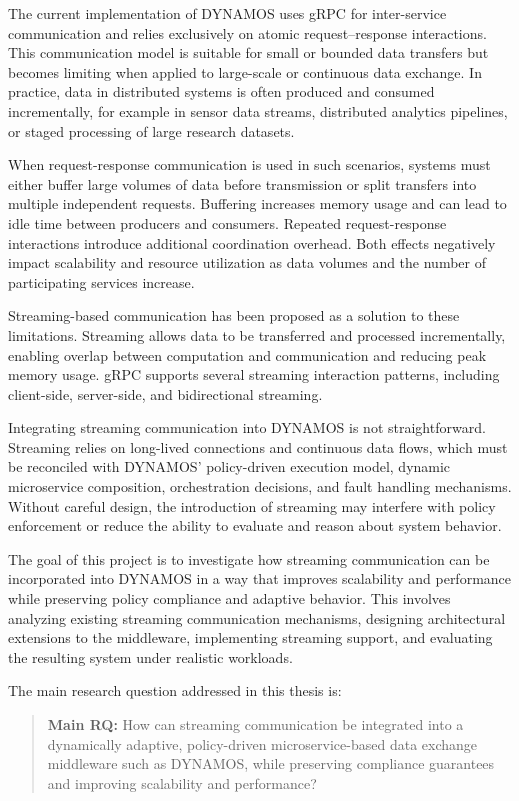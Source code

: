 \documentclass[a4paper,10pt,british]{scrartcl}
\begin{document}
The current implementation of DYNAMOS uses gRPC for inter-service communication and relies exclusively on atomic request--response interactions. This communication model is suitable for small or bounded data transfers but becomes limiting when applied to large-scale or continuous data exchange. In practice, data in distributed systems is often produced and consumed incrementally, for example in sensor data streams, distributed analytics pipelines, or staged processing of large research datasets.

When request-response communication is used in such scenarios, systems must either buffer large volumes of data before transmission or split transfers into multiple independent requests. Buffering increases memory usage and can lead to idle time between producers and consumers. Repeated request-response interactions introduce additional coordination overhead. Both effects negatively impact scalability and resource utilization as data volumes and the number of participating services increase.

Streaming-based communication has been proposed as a solution to these limitations. Streaming allows data to be transferred and processed incrementally, enabling overlap between computation and communication and reducing peak memory usage. gRPC supports several streaming interaction patterns, including client-side, server-side, and bidirectional streaming.

Integrating streaming communication into DYNAMOS is not straightforward. Streaming relies on long-lived connections and continuous data flows, which must be reconciled with DYNAMOS’ policy-driven execution model, dynamic microservice composition, orchestration decisions, and fault handling mechanisms. Without careful design, the introduction of streaming may interfere with policy enforcement or reduce the ability to evaluate and reason about system behavior.

The goal of this project is to investigate how streaming communication can be incorporated into DYNAMOS in a way that improves scalability and performance while preserving policy compliance and adaptive behavior. This involves analyzing existing streaming communication mechanisms, designing architectural extensions to the middleware, implementing streaming support, and evaluating the resulting system under realistic workloads.

The main research question addressed in this thesis is:

\begin{quote}
\textbf{Main RQ:} How can streaming communication be integrated into a dynamically adaptive, policy-driven microservice-based data exchange middleware such as DYNAMOS, while preserving compliance guarantees and improving scalability and performance?
\end{quote}
\end{document}

